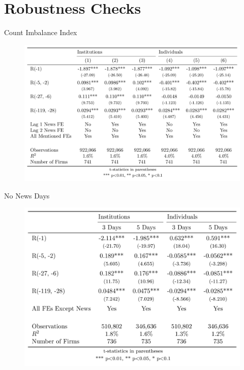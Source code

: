 \documentclass{beamer}
\begin{document}
\section{Robustness Checks}

\begin{frame}{Count Imbalance Index}
    \begin{figure}
        \includegraphics[width=\textwidth]{ci.png}
    \end{figure}
\end{frame}




\begin{frame}{No News Days}
    \begin{figure}
        \includegraphics[scale = .22]{nonews.png}
    \end{figure}
\end{frame}
\end{document}
